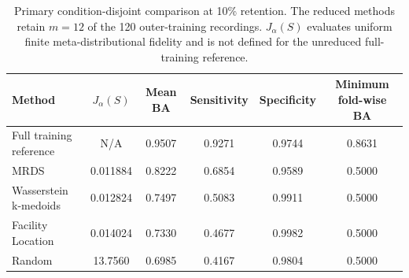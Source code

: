 \begin{table}[t]
\centering
\caption{Primary condition-disjoint comparison at 10\% retention.
The reduced methods retain $m=12$ of the 120 outer-training recordings.
$J_\alpha(S)$ evaluates uniform finite meta-distributional fidelity and is not
defined for the unreduced full-training reference.}
\small
\begin{tabular*}{\textwidth}{@{\extracolsep{\fill}}lccccc@{}}
\toprule
Method & $J_\alpha(S)$ & Mean BA & Sensitivity & Specificity & Minimum fold-wise BA \\
\midrule
Full training reference & N/A & 0.9507 & 0.9271 & 0.9744 & 0.8631 \\
MRDS & 0.011884 & 0.8222 & 0.6854 & 0.9589 & 0.5000 \\
Wasserstein k-medoids & 0.012824 & 0.7497 & 0.5083 & 0.9911 & 0.5000 \\
Facility Location & 0.014024 & 0.7330 & 0.4677 & 0.9982 & 0.5000 \\
Random & 13.7560 & 0.6985 & 0.4167 & 0.9804 & 0.5000 \\
\bottomrule
\end{tabular*}
\end{table}

